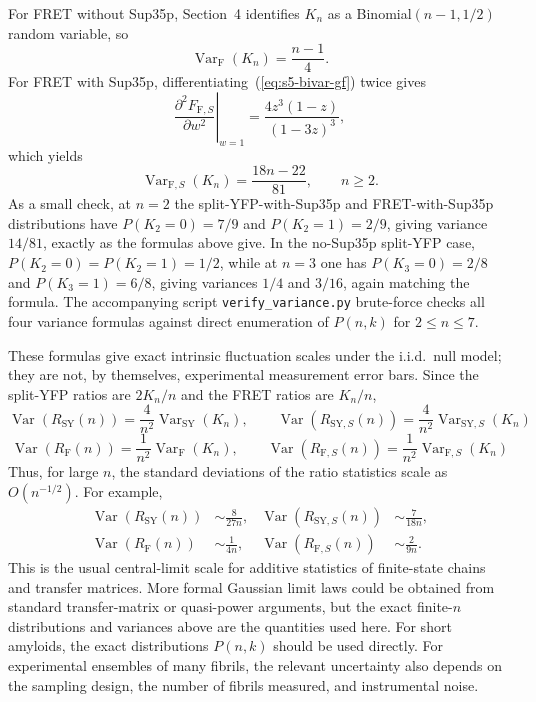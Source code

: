 \documentclass[referee,lineno,pdflatex,sn-mathphys-ay]{sn-jnl}
\begin{document}
For FRET without Sup35p, Section~4 identifies $K_n$ as a Binomial$(n-1,1/2)$ random variable, so
\[
\operatorname{Var}_{\text{F}}(K_n)=\frac{n-1}{4}.
\]
For FRET with Sup35p, differentiating~(\ref{eq:s5-bivar-gf}) twice gives
\[
\left. \frac{\partial^2 F_{\text{F},S}}{\partial w^2} \right|_{w=1}
= \frac{4z^3(1-z)}{(1-3z)^3},
\]
which yields
\[
\operatorname{Var}_{\text{F},S}(K_n)=\frac{18n-22}{81},
\qquad n \ge 2.
\]
As a small check, at $n=2$ the split-YFP-with-Sup35p and FRET-with-Sup35p distributions have $P(K_2=0)=7/9$ and $P(K_2=1)=2/9$, giving variance $14/81$, exactly as the formulas above give. In the no-Sup35p split-YFP case, $P(K_2=0)=P(K_2=1)=1/2$, while at $n=3$ one has $P(K_3=0)=2/8$ and $P(K_3=1)=6/8$, giving variances $1/4$ and $3/16$, again matching the formula. The accompanying script \texttt{verify\_variance.py} brute-force checks all four variance formulas against direct enumeration of $P(n,k)$ for $2 \le n \le 7$.

These formulas give exact intrinsic fluctuation scales under the i.i.d.\ null model; they are not, by themselves, experimental measurement error bars. Since the split-YFP ratios are $2K_n/n$ and the FRET ratios are $K_n/n$,
\[
\operatorname{Var}(R_{\text{SY}}(n)) = \frac{4}{n^2}\operatorname{Var}_{\text{SY}}(K_n), \qquad
\operatorname{Var}(R_{\text{SY},S}(n)) = \frac{4}{n^2}\operatorname{Var}_{\text{SY},S}(K_n)
\]
\[
\operatorname{Var}(R_{\text{F}}(n)) = \frac{1}{n^2}\operatorname{Var}_{\text{F}}(K_n), \qquad
\operatorname{Var}(R_{\text{F},S}(n)) = \frac{1}{n^2}\operatorname{Var}_{\text{F},S}(K_n)
\]
Thus, for large $n$, the standard deviations of the ratio statistics scale as $O(n^{-1/2})$. For example,
\begin{align*}
\operatorname{Var}(R_{\text{SY}}(n)) &\sim \frac{8}{27n}, &
\operatorname{Var}(R_{\text{SY},S}(n)) &\sim \frac{7}{18n}, \\
\operatorname{Var}(R_{\text{F}}(n)) &\sim \frac{1}{4n}, &
\operatorname{Var}(R_{\text{F},S}(n)) &\sim \frac{2}{9n}.
\end{align*}
This is the usual central-limit scale for additive statistics of finite-state chains and transfer matrices. More formal Gaussian limit laws could be obtained from standard transfer-matrix or quasi-power arguments, but the exact finite-$n$ distributions and variances above are the quantities used here. For short amyloids, the exact distributions $P(n,k)$ should be used directly. For experimental ensembles of many fibrils, the relevant uncertainty also depends on the sampling design, the number of fibrils measured, and instrumental noise.
\end{document}
